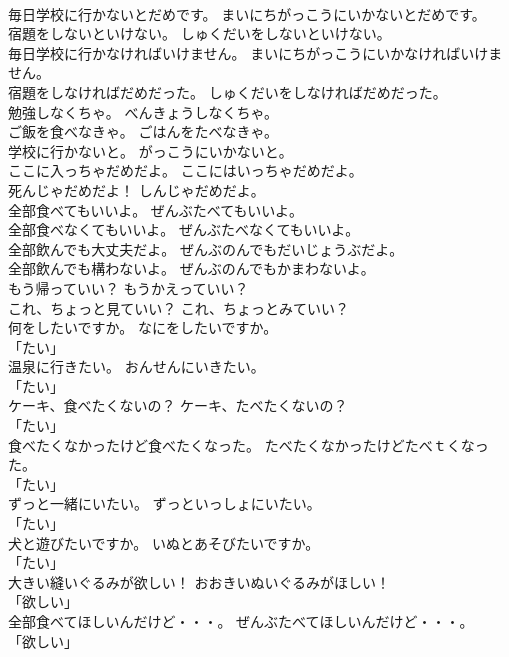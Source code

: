 \documentclass[8pt]{extreport}
\begin{document}
\begin{CJK}{UTF8}{min}
\\	毎日学校に行かないとだめです。	まいにちがっこうにいかないとだめです。	
\\	宿題をしないといけない。	しゅくだいをしないといけない。	
\\	毎日学校に行かなければいけません。	まいにちがっこうにいかなければいけません。	
\\	宿題をしなければだめだった。	しゅくだいをしなければだめだった。	
\\	勉強しなくちゃ。	べんきょうしなくちゃ。	
\\	ご飯を食べなきゃ。	ごはんをたべなきゃ。	
\\	学校に行かないと。	がっこうにいかないと。	
\\	ここに入っちゃだめだよ。	ここにはいっちゃだめだよ。	
\\	死んじゃだめだよ！	しんじゃだめだよ。	
\\	全部食べてもいいよ。	ぜんぶたべてもいいよ。	
\\	全部食べなくてもいいよ。	ぜんぶたべなくてもいいよ。	
\\	全部飲んでも大丈夫だよ。	ぜんぶのんでもだいじょうぶだよ。	
\\	全部飲んでも構わないよ。	ぜんぶのんでもかまわないよ。	
\\	もう帰っていい？	もうかえっていい？	
\\	これ、ちょっと見ていい？	これ、ちょっとみていい？	
\\	何をしたいですか。	なにをしたいですか。	
\\	「たい」	
\\	温泉に行きたい。	おんせんにいきたい。	
\\	「たい」	
\\	ケーキ、食べたくないの？	ケーキ、たべたくないの？	
\\	「たい」	
\\	食べたくなかったけど食べたくなった。	たべたくなかったけどたべｔくなった。	
\\	「たい」	
\\	ずっと一緒にいたい。	ずっといっしょにいたい。	
\\	「たい」	
\\	犬と遊びたいですか。	いぬとあそびたいですか。	
\\	「たい」	
\\	大きい縫いぐるみが欲しい！	おおきいぬいぐるみがほしい！	
\\	「欲しい」	
\\	全部食べてほしいんだけど・・・。	ぜんぶたべてほしいんだけど・・・。	
\\	「欲しい」	

\end{CJK}
\end{document}
